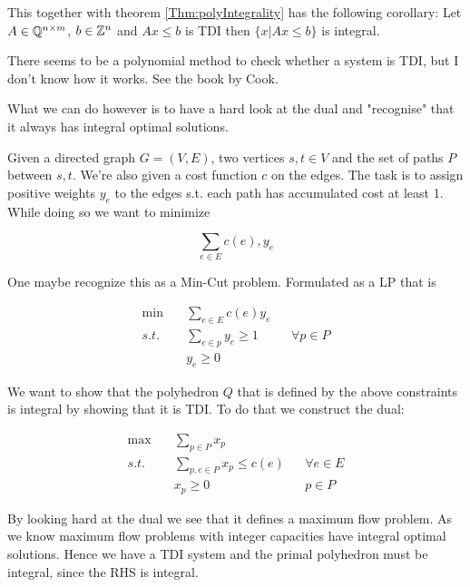 This together with theorem \ref{Thm:polyIntegrality} has the following corollary: Let $A\in \mathbb{Q}^{n\times m}$, $b\in \mathbb{Z}^n$ and $Ax\leq b$ is TDI then $\{x|Ax\leq b\}$ is integral.

There seems to be a polynomial method to check whether a system is TDI, but I don't know how it works. See the book by Cook.

What we can do however is to have a hard look at the dual and "recognise" that it always has integral optimal solutions.

\begin{Ex} Given a directed graph $G=(V,E)$, two vertices $s,t\in V$ and the set of paths $P$ between $s,t$. We're also given a cost function $c$ on the edges. The task is to assign positive weights $y_e$ to the edges s.t. each path has accumulated cost at least 1. While doing so we want to minimize

\[\sum_{e\in E} c(e), y_e\]

One maybe recognize this as a Min-Cut problem. Formulated as a LP that is 

\begin{align*}
\min \quad & \sum_{e\in E} c(e) y_e\\
s.t. & \sum_{e\in p} y_e \geq 1 && \forall p\in P\\
&y_e \geq 0
\end{align*}

We want to show that the polyhedron $Q$ that is defined by the above constraints is integral by showing that it is TDI. To do that we construct the dual:

\begin{align*}
\max \quad & \sum_{p\in P} x_p\\
s.t. & \sum_{p,e\in P} x_p \leq c(e) && \forall e\in E\\
 & x_p \geq 0 && p\in P
\end{align*}

By looking hard at the dual we see that it defines a maximum flow problem. As we know maximum flow problems with integer capacities have integral optimal solutions. Hence we have a TDI system and the primal polyhedron must be integral, since the RHS is integral.
\end{Ex}